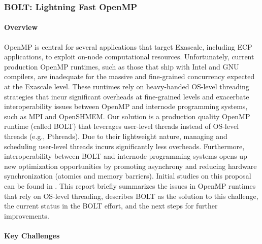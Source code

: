 \subsubsection{ BOLT: Lightning Fast OpenMP}\label{subsubsect:bolt}

\paragraph{Overview}

OpenMP is central for several applications that target Exascale,
including ECP applications, to exploit on-node computational
resources.  Unfortunately, current production OpenMP runtimes, such as
those that ship with Intel and GNU compilers, are inadequate for the
massive and fine-grained concurrency expected at the Exascale level.
These runtimes rely on heavy-handed OS-level threading strategies that
incur significant overheads at fine-grained levels and exacerbate
interoperability issues between OpenMP and internode programming
systems, such as MPI and OpenSHMEM.  Our solution is a production
quality OpenMP runtime (called BOLT) that leverages user-level threads
instead of OS-level threads (e.g., Pthreads).  Due to their
lightweight nature, managing and scheduling user-level threads incurs
significantly less overheads.  Furthermore, interoperability between
BOLT and internode programming systems opens up new optimization
opportunities by promoting asynchrony and reducing hardware
synchronization (atomics and memory barriers).  Initial studies on
this proposal can be found in \cite{amer2018, ccgrid, ppopp}. This
report briefly summarizes the issues in OpenMP runtimes that rely on
OS-level threading, describes BOLT as the solution to this challenge,
the current status in the BOLT effort, and the next steps for further
improvements.

\paragraph{Key Challenges}

